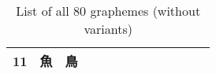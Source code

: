 \documentclass[a4paper,headsepline=3pt,headinclude=true,12pt,oneside]{scrartcl}
\begin{document}
\begin{onehalfspace}
\begin{table}[h]
\begin{tabular}{rcccccccccccc}
            \textbf{11}          & 魚 & 鳥                                                                                    \\
            \bottomrule[2pt]
        \end{tabular}
        \caption{List of all 80 graphemes (without variants)}
        \label{graphemes}
    \end{table}

    \begin{large}
        
    \end{large}

\end{onehalfspace}
\end{document}
